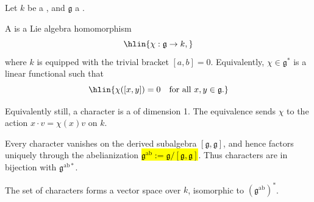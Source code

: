 \begin{definition} \label{definition:character_of_a_lie_algebra_valued_in_a_field}

    Let $k$ be a , and $\mathfrak{g}$ a .

    A  is a Lie algebra homomorphism
    $$\hlin{\chi : \mathfrak{g} \to k,}$$
    where $k$ is equipped with the trivial bracket $[a,b] = 0$. Equivalently, $\chi \in \mathfrak{g}^*$ is a linear functional such that
    $$\hlin{\chi([x,y]) = 0 \quad \text{for all } x,y \in \mathfrak{g}.}$$

    Equivalently still, a character is a  of dimension 1. The equivalence sends $\chi$ to the action $x \cdot v = \chi(x)v$ on $k$.

    Every character vanishes on the derived subalgebra $[\mathfrak{g},\mathfrak{g}]$, and hence factors uniquely through the abelianization \hl{$\mathfrak{g}^{\mathrm{ab}} := \mathfrak{g}/[\mathfrak{g},\mathfrak{g}]$}. Thus characters are in bijection with $\mathfrak{g}^{\mathrm{ab}*}$.

    The set of characters forms a vector space over $k$, isomorphic to $(\mathfrak{g}^{\mathrm{ab}})^*$.
\end{definition}
